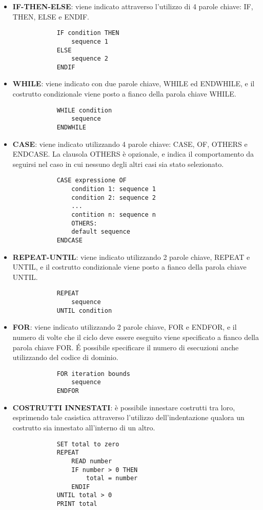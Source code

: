 \begin{itemize}
	\item \textbf{IF-THEN-ELSE}: viene indicato attraverso l'utilizzo di 4 parole chiave: IF, THEN, ELSE e ENDIF.
		\begin{verbatim}
			IF condition THEN
				sequence 1
			ELSE
				sequence 2
			ENDIF
		\end{verbatim}
	\item \textbf{WHILE}: viene indicato con due parole chiave, WHILE ed ENDWHILE, e il costrutto condizionale viene posto a fianco della parola chiave WHILE.
		\begin{verbatim}
			WHILE condition
				sequence
			ENDWHILE			
		\end{verbatim}
	\item \textbf{CASE}: viene indicato utilizzando 4 parole chiave: CASE, OF, OTHERS e ENDCASE. La clausola OTHERS è opzionale, e indica il comportamento da seguirsi nel caso in cui nessuno degli altri casi sia stato selezionato.
		\begin{verbatim}
			CASE expressione OF
				condition 1: sequence 1
				condition 2: sequence 2
				...
				contition n: sequence n
				OTHERS:
				default sequence
			ENDCASE
		\end{verbatim}		 	
	\item \textbf{REPEAT-UNTIL}: viene indicato utilizzando 2 parole chiave, REPEAT e UNTIL, e il costrutto condizionale viene posto a fianco della parola chiave UNTIL.
		\begin{verbatim}
			REPEAT
				sequence
			UNTIL condition
		\end{verbatim}
	\item \textbf{FOR}: viene indicato utilizzando 2 parole chiave, FOR e ENDFOR, e il numero di volte che il ciclo deve essere eseguito viene specificato a fianco della parola chiave FOR. É possibile specificare il numero di esecuzioni anche utilizzando del codice di dominio.
		\begin{verbatim}
			FOR iteration bounds
				sequence
			ENDFOR
		\end{verbatim}
		
	\item \textbf{COSTRUTTI INNESTATI}: è possibile innestare costrutti tra loro, esprimendo tale casistica attraverso l'utilizzo dell'indentazione qualora un costrutto sia innestato all'interno di un altro.
		\begin{verbatim}
			SET total to zero
			REPEAT
				READ number
				IF number > 0 THEN
					total = number
				ENDIF
			UNTIL total > 0
			PRINT total					
		\end{verbatim}
		

\end{itemize}
